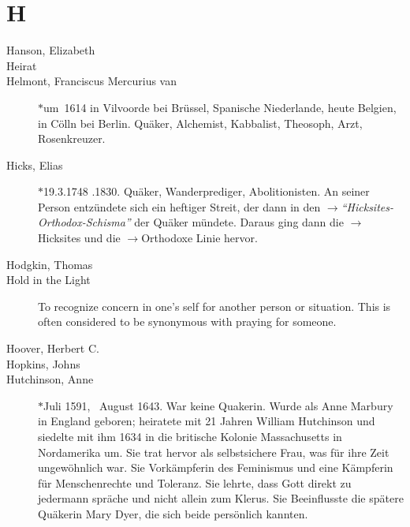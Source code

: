 \section*{H}

\articlesize

\begin{description}

 \item[Hanson, Elizabeth]

 \item[Heirat]

 \item[Helmont, Franciscus Mercurius van] $\ast$um~1614 in Vilvoorde bei Brüssel, Spanische Niederlande, heute Belgien,  in Cölln bei Berlin. Quäker, Alchemist, Kabbalist, Theosoph, Arzt, Rosenkreuzer.

 \item[Hicks, Elias] $\ast$19.3.1748 .1830. Quäker, Wanderprediger, Abolitionisten. An seiner Person entzündete sich ein heftiger Streit, der dann in den  $\to$\textit{"`Hicksites-Orthodox-Schisma"'} der Quäker mündete. Daraus ging dann die $\to$Hicksites und die $\to$Orthodoxe Linie hervor.

 \item[Hodgkin, Thomas]

\item[Hold in the Light]
    To recognize concern in one's self for another person or situation. This is often considered to be synonymous with praying for someone.

 \item[Hoover, Herbert C.]

 \item[Hopkins, Johns]

 \item[Hutchinson, Anne] $\ast$Juli 1591, \dag~August 1643. War keine Quakerin. Wurde als Anne Marbury in England geboren; heiratete mit 21 Jahren William Hutchinson und siedelte mit ihm 1634 in die britische Kolonie Massachusetts in Nordamerika um. Sie trat hervor als selbstsichere Frau, was für ihre Zeit ungewöhnlich war. Sie Vorkämpferin des Feminismus und eine Kämpferin für Menschenrechte und Toleranz. Sie lehrte, dass Gott direkt zu jedermann spräche und nicht allein zum Klerus. Sie Beeinflusste die spätere Quäkerin Mary Dyer, die sich beide persönlich kannten.


 \end{description}

\normalsize
